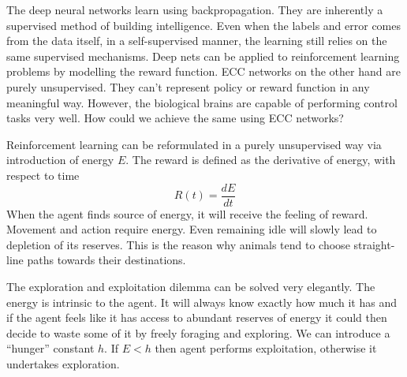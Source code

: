 \documentclass[12pt]{article}
\begin{document}

The deep neural networks learn using backpropagation. They are inherently a supervised method of building intelligence. Even when the labels and error comes from the data itself, in a self-supervised manner, the learning still relies on the same supervised mechanisms. Deep nets can be applied to reinforcement learning problems by modelling the reward function. ECC networks on the other hand are purely unsupervised. They can't represent policy or reward function in any meaningful way. However, the biological brains are capable of performing control tasks very well. How could we achieve the same using ECC networks?


Reinforcement learning can be reformulated in a purely unsupervised way via introduction of energy $E$. The reward is defined as the derivative of energy, with respect to time
\[
R(t) = \frac{dE}{dt}
\]
When the agent finds source of energy, it will receive the feeling of reward.
Movement and action require energy. Even remaining idle will slowly lead to depletion of its reserves. This is the reason why animals tend to choose straight-line paths towards their destinations. 

The exploration and exploitation dilemma can be solved very elegantly. The energy is intrinsic to the agent. It will always know exactly how much it has and if the agent feels like it has access to abundant reserves of energy it could then decide to waste some of it by freely foraging and exploring. We can introduce a ``hunger'' constant  $h$. If $E<h$ then agent performs exploitation, otherwise it undertakes exploration.
\end{document}
